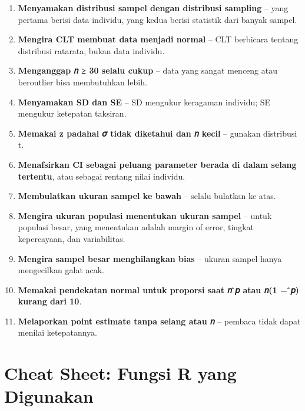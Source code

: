 \documentclass[
  indonesian,
  letterpaper,
]{book}
\providecommand{\tightlist}{%
  \setlength{\itemsep}{0pt}\setlength{\parskip}{0pt}}
\begin{document}
\begin{enumerate}
\def\labelenumi{\arabic{enumi}.}
\tightlist
\item
  \textbf{Menyamakan distribusi sampel dengan distribusi sampling} --
  yang pertama berisi data individu, yang kedua berisi statistik dari
  banyak sampel.
\item
  \textbf{Mengira CLT membuat data menjadi normal} -- CLT berbicara
  tentang distribusi ratarata, bukan data individu.
\item
  \textbf{Menganggap 𝑛 ≥ 30 selalu cukup} -- data yang sangat menceng
  atau beroutlier bisa membutuhkan lebih.
\item
  \textbf{Menyamakan SD dan SE} -- SD mengukur keragaman individu; SE
  mengukur ketepatan taksiran.
\item
  \textbf{Memakai z padahal 𝜎 tidak diketahui dan 𝑛 kecil} -- gunakan
  distribusi t.
\item
  \textbf{Menafsirkan CI sebagai peluang parameter berada di dalam
  selang tertentu}, atau sebagai rentang nilai individu.
\item
  \textbf{Membulatkan ukuran sampel ke bawah} -- selalu bulatkan ke
  atas.
\item
  \textbf{Mengira ukuran populasi menentukan ukuran sampel} -- untuk
  populasi besar, yang menentukan adalah margin of error, tingkat
  kepercayaan, dan variabilitas.
\item
  \textbf{Mengira sampel besar menghilangkan bias} -- ukuran sampel
  hanya mengecilkan galat acak.
\item
  \textbf{Memakai pendekatan normal untuk proporsi saat 𝑛 ̂𝑝 atau 𝑛(1 −
  ̂𝑝) kurang dari 10}.
\item
  \textbf{Melaporkan point estimate tanpa selang atau 𝑛} -- pembaca
  tidak dapat menilai ketepatannya.
\end{enumerate}


\chapter{Cheat Sheet: Fungsi R yang
Digunakan}\label{cheat-sheet-fungsi-r-yang-digunakan}

\begingroup\fontsize{12}{14}\selectfont
\end{document}
